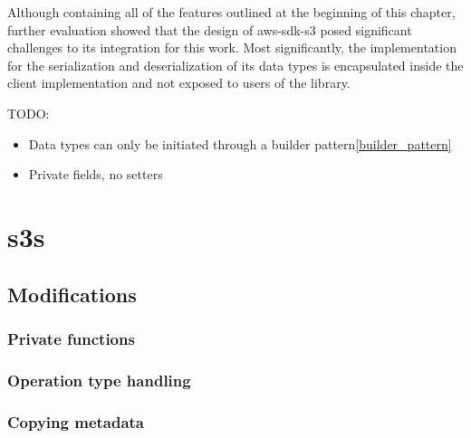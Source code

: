 Although containing all of the features outlined at the beginning of this chapter, further evaluation showed that the design of aws-sdk-s3 posed significant challenges to its integration for this work. Most significantly, the implementation for the serialization and deserialization of its data types is encapsulated inside the client implementation and not exposed to users of the library.


TODO: 
\begin{itemize}
	\item Data types can only be initiated through a builder pattern\ref{builder_pattern}
	\item Private fields, no setters
\end{itemize}

\section{s3s}

\subsection{Modifications}
\subsubsection{Private functions}
\label{s3s_mod_pub}
\subsubsection{Operation type handling}
\label{s3s_mod_op}
\subsubsection{Copying metadata}
\label{s3s_mod_meta}